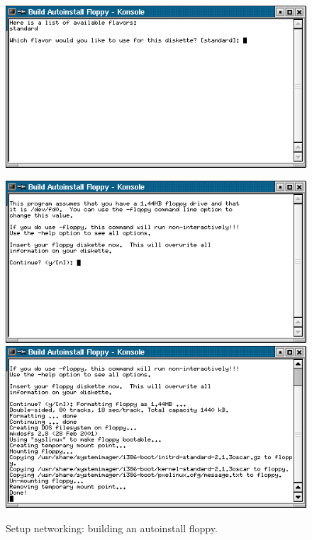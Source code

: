 \begin{figure}[h!]
  \begin{center}
    \centerline{\includegraphics[scale=\imgscale]{figs/6ba_sbs-autoinstall-flpy1}}
    \vspace{\imgvskip}
    \centerline{
      \includegraphics[scale=\imgscale]{figs/6bb_sbs-autoinstall-flpy2}
      \hspace{\imghskip}
      \includegraphics[scale=\imgscale]{figs/6bc_sbs-autoinstall-flpy3}
      }
    \caption{Setup networking: building an autoinstall floppy.}
    \label{fig:sbs-autoinstall-flpy1}
  \end{center}
\end{figure}

